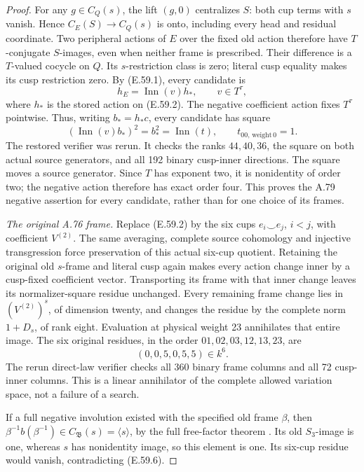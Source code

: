 \begin{proof}
For any \(g\in C_Q(s)\), the lift \((g,0)\) centralizes
\(S\): both cup terms with \(s\) vanish. Hence
\(C_E(S)\to C_Q(s)\) is onto, including every head and
residual coordinate. Two peripheral actions of \(E\) over the
fixed old action therefore have \(T\)-conjugate \(S\)-images,
even when neither frame is prescribed. Their difference is a
\(T\)-valued cocycle on \(Q\). Its \(s\)-restriction class
is zero; literal cusp equality makes its cusp restriction zero.
By (E.59.1), every candidate is
\[
 h_E=\operatorname{Inn}(v)h_*,\qquad v\in T^\tau,
                                                        \tag{E.59.4}
\]
where \(h_*\) is the stored action on (E.59.2).
The negative coefficient action fixes \(T^\tau\) pointwise.
Thus, writing \(b_*=h_*c\), every candidate has square
\[
 (\operatorname{Inn}(v)b_*)^2=b_*^2
   =\operatorname{Inn}(t),\qquad
 t_{00,\,\mathrm{weight}\,0}=1.                          \tag{E.59.5}
\]
The restored verifier
was rerun. It checks the ranks \(44,40,36\), the square on
both actual source generators, and all 192 binary cusp-inner
directions. The square moves a source generator. Since \(T\)
has exponent two, it is nonidentity of order two; the negative
action therefore has exact order four. This proves the A.79
negative assertion for every candidate, rather than for one choice
of its frames.

\emph{The original A.76 frame.}
Replace (E.59.2) by the six cups \(e_i\smile e_j\),
\(i<j\), with coefficient \(V^{(2)}\). The same averaging,
complete source cohomology and injective transgression force
preservation of this actual six-cup quotient. Retaining the original
old \(s\)-frame and literal cusp again makes every action change
inner by a cusp-fixed coefficient vector. Transporting its frame
with that inner change leaves its normalizer-square residue unchanged.
Every remaining frame change lies in \((V^{(2)})^s\), of
dimension twenty, and changes the residue by the complete norm
\(1+D_s\), of rank eight. Evaluation at physical weight 23
annihilates that entire image. The six original residues, in the
order \(01,02,03,12,13,23\), are
\[
                         (0,0,5,0,5,5)\in k^6.           \tag{E.59.6}
\]
The rerun direct-law verifier checks all 360 binary frame columns
and all 72 cusp-inner columns. This is a linear annihilator of the
complete allowed variation space, not a failure of a search.

If a full negative involution existed with the specified old frame
\(\beta\), then
\(\beta^{-1}b(\beta^{-1})\in C_{\mathfrak B}(s)=\langle s\rangle\),
by the full free-factor theorem
\citep[Theorem B']{SymHerfortRibes1985}. Its old \(S_3\)-image
is one, whereas \(s\) has nonidentity image, so this element is
one. Its six-cup residue would vanish, contradicting (E.59.6).


\end{proof}
